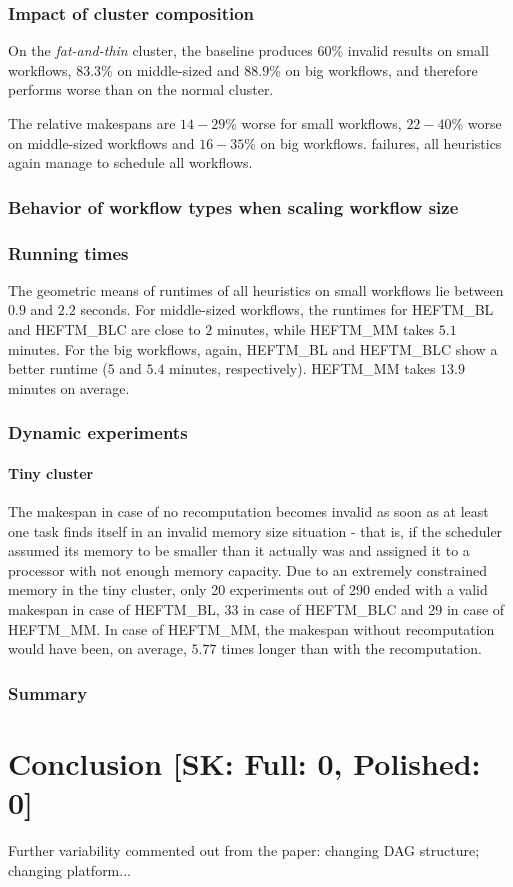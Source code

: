\documentclass[conference]{IEEEtran}
\newcommand{\algo}[1]{\textsc{#1}}
\newcommand{\heftmm}{\algo{HEFTM\_MM}\xspace}
\newcommand{\heftbl}{\algo{HEFTM\_BL}\xspace}
\newcommand{\heftblc}{\algo{HEFTM\_BLC}\xspace}
\newcommand{\skug}[1]{{\color{blue}[SK: #1]}}
\begin{document}
    \subsubsection{Impact of cluster composition}
    On the {\em fat-and-thin} cluster, the baseline produces $60$\% invalid results on small workflows, $83.3$\% on
    middle-sized and $88.9$\% on big workflows, and therefore performs worse than on the normal cluster.

    The relative makespans are $14-29$\% worse for small workflows, $22-40$\% worse on middle-sized workflows and $16-35$\%
    on big workflows.
    \wrt failures, all heuristics again manage to schedule all workflows.
    \subsubsection{Behavior of workflow types when scaling workflow size}
    \subsubsection{Running times}
    The geometric means of runtimes of all heuristics on small workflows lie between $0.9$ and $2.2$ seconds.
    For middle-sized workflows, the runtimes for \heftbl and \heftblc are close to $2$ minutes, while \heftmm
    takes $5.1$ minutes.
    For the big workflows, again, \heftbl and \heftblc show a better runtime ($5$ and $5.4$ minutes, respectively).
    \heftmm takes $13.9$ minutes on average.
    \subsubsection{Dynamic experiments}
    \paragraph{Tiny cluster}
    The makespan in case of no recomputation becomes invalid as soon as at least one task finds itself in an invalid memory size
    situation - that is, if the scheduler assumed its memory to be smaller than it actually was and assigned it to a processor
    with not enough memory capacity.
    Due to an extremely constrained memory in the tiny cluster, only 20 experiments out of 290 ended with a valid makespan
    in case of \heftbl, 33 in case of \heftblc and 29 in case of \heftmm.
    In case of \heftmm, the makespan without recomputation would have been, on average, $5.77$ times longer than with the recomputation.


    \subsubsection{Summary}

    \section{Conclusion  \skug{Full: 0, Polished: 0}}

Further variability commented out from the paper: changing DAG structure; changing platform...


    
    
\end{document}
